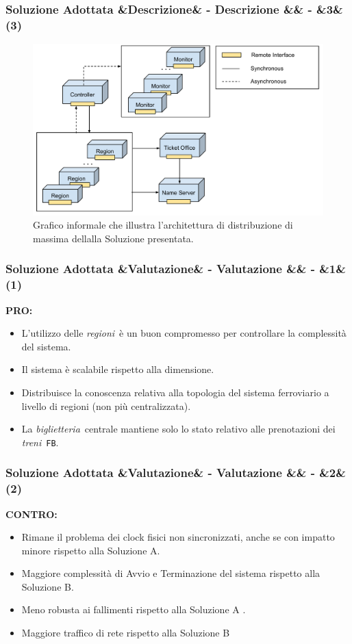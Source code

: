 \documentclass[slidestop,compress,blackandwhite]{beamer}
\newcommand{\ttt}[1]{\texttt{#1}}
\newcommand{\ii}[1]{\textit{#1}}
\newcommand{\treni}{\ii{treni}}
\newcommand{\biglietteria}{\ii{biglietteria}}
\newcommand{\regioni}{\ii{regioni}}
\newcommand{\PRO}{\textbf{PRO:}}
\newcommand{\CONTRO}{\textbf{CONTRO:}}
\newcommand{\newtitle}[4]{
	#1 
	\ifx&#2&%
	\else
  		\large- #2
	\fi
	\ifx&#3&%
	\else
  		\normalsize- #3
	\fi
	\ifx&#4&%
	\else
  		\normalsize (#4)
	\fi
}
\newcommand{\newframe}[5]{
	\begin{frame}
		\frametitle{\newtitle{#1}{#2}{#3}{#4}}
		#5
	\end{frame}
}
\begin{document}
	\newframe{Soluzione Adottata}{Descrizione}{}{3}{
		\begin{figure}
			\includegraphics[scale=0.28,trim=0mm 0mm 0mm 20mm]{imgs/solution.pdf}
			\caption{\small Grafico informale che illustra l'architettura di distribuzione di massima dellalla Soluzione presentata.}
		\end{figure}
	}
	
	
	\newframe{Soluzione Adottata}{Valutazione}{}{1}{
		\vspace{0.5cm}
		\PRO
		\begin{itemize}
			\item L'utilizzo delle \regioni~è un buon compromesso per controllare la complessità del sistema.
			\item Il sistema è scalabile rispetto alla dimensione.
			\item Distribuisce la conoscenza relativa alla topologia del sistema ferroviario a livello di regioni (non più centralizzata).
			\item La \biglietteria~centrale mantiene solo lo stato relativo alle prenotazioni dei \treni~\ttt{FB}.
		\end{itemize}
	
	}
	
	\newframe{Soluzione Adottata}{Valutazione}{}{2}{
		\vspace{0.5cm}
		\CONTRO
		\begin{itemize}
			\item Rimane il problema dei clock fisici non sincronizzati, anche se con impatto minore rispetto alla Soluzione A.
			\item Maggiore complessità di Avvio e Terminazione del sistema rispetto alla Soluzione B.
			\item Meno robusta ai fallimenti rispetto alla Soluzione A .
			\item Maggiore traffico di rete rispetto alla Soluzione B
		\end{itemize}
	}
	
\end{document}
